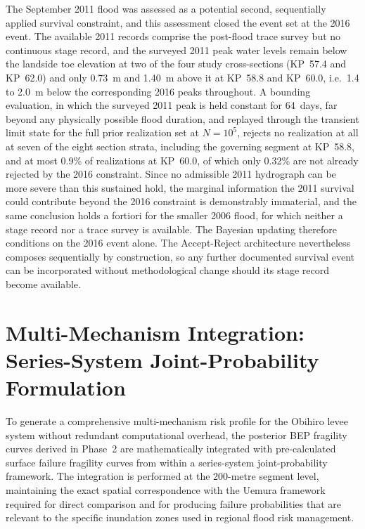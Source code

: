 The September 2011 flood was assessed as a potential second, sequentially applied survival constraint, and this assessment closed the event set at the 2016 event. The available 2011 records comprise the post-flood trace survey but no continuous stage record, and the surveyed 2011 peak water levels remain below the landside toe elevation at two of the four study cross-sections (KP~57.4 and KP~62.0) and only 0.73~m and 1.40~m above it at KP~58.8 and KP~60.0, i.e.\ 1.4 to 2.0~m below the corresponding 2016 peaks throughout. A bounding evaluation, in which the surveyed 2011 peak is held constant for 64~days, far beyond any physically possible flood duration, and replayed through the transient limit state for the full prior realization set at $N = 10^5$, rejects no realization at all at seven of the eight section strata, including the governing segment at KP~58.8, and at most 0.9\% of realizations at KP~60.0, of which only 0.32\% are not already rejected by the 2016 constraint. Since no admissible 2011 hydrograph can be more severe than this sustained hold, the marginal information the 2011 survival could contribute beyond the 2016 constraint is demonstrably immaterial, and the same conclusion holds a fortiori for the smaller 2006 flood, for which neither a stage record nor a trace survey is available. The Bayesian updating therefore conditions on the 2016 event alone. The Accept-Reject architecture nevertheless composes sequentially by construction, so any further documented survival event can be incorporated without methodological change should its stage record become available.


\section{Multi-Mechanism Integration: Series-System Joint-Probability Formulation}
\label{sec: Multi-Mechanism Integration: Series-System Joint-Probability Formulation}

To generate a comprehensive multi-mechanism risk profile for the Obihiro levee system without redundant computational overhead, the posterior BEP fragility curves derived in Phase~2 are mathematically integrated with pre-calculated surface failure fragility curves from \textcite{uemura_phd_2025} within a series-system joint-probability framework. The integration is performed at the 200-metre segment level, maintaining the exact spatial correspondence with the Uemura framework required for direct comparison and for producing failure probabilities that are relevant to the specific inundation zones used in regional flood risk management.

